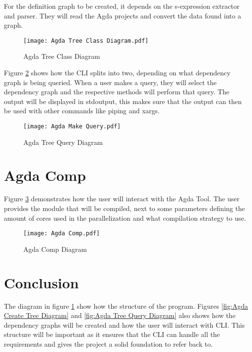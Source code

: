 For the definition graph to be created, it depends on the s-expression
extractor and parser. They will read the Agda projects and convert the data
found into a graph.

\begin{figure}[H]
    \centering
    \label{fig:Agda Tree Class Diagram}
    \texttt{[image: Agda Tree Class Diagram.pdf]}
    \caption{Agda Tree Class Diagram}
\end{figure} 
    
\pagebreak

Figure \ref{fig:Agda Tree Query Diagram} shows how the CLI splits into two,
depending on what dependency graph is being queried. When a user makes a query,
they will select the dependency graph and the respective methods will perform
that query. The output will be displayed in stdoutput, this makes sure that the
output can then be used with other commands like piping and xargs.

\begin{figure}[H]
    \centering
    \label{fig:Agda Tree Query Diagram}
    \texttt{[image: Agda Make Query.pdf]}
    \caption{Agda Tree Query Diagram}
\end{figure} 

\pagebreak 


\section{Agda Comp}


Figure \ref{fig:Agda Comp Diagram} demonstrates how the user will interact with
the Agda Tool. The user provides the module that will be compiled, next to some
parameters defining the amount of cores used in the parallelization and what
compilation strategy to use.
\begin{figure}[H]
    \centering 
    \label{fig:Agda Comp Diagram}
    \texttt{[image: Agda Comp.pdf]}
    \caption{Agda Comp Diagram}
\end{figure} 


\pagebreak

\section{Conclusion}

The diagram in figure \ref{fig:Agda Tree Class Diagram} show how the structure
of the program. Figures \ref{fig:Agda Create Tree Diagram} and \ref{fig:Agda
Tree Query Diagram} also shows how the dependency graphs will be created and
how the user will interact with CLI. This structure will be important as it
ensures that the CLI can handle all the requirements and gives the project a
solid foundation to refer back to. 

